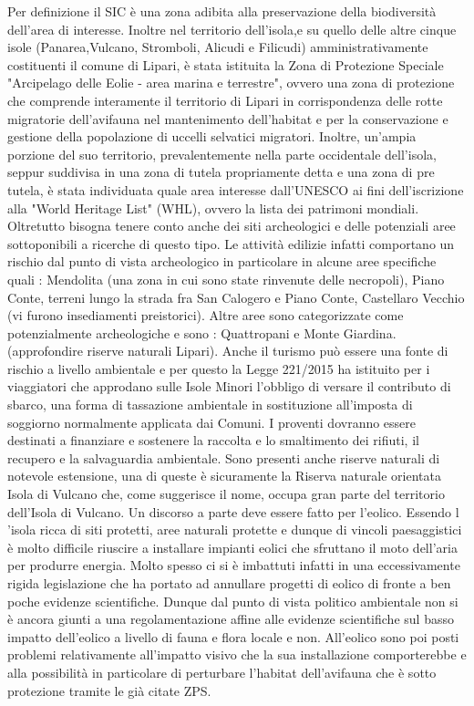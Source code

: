 \documentclass[fleqn,10pt]{SelfArx} %
\begin{document}
Per definizione il SIC è una zona adibita alla preservazione della biodiversità dell'area di interesse. 
Inoltre nel territorio dell'isola,e su quello delle altre cinque isole (Panarea,Vulcano, Stromboli, Alicudi e Filicudi) amministrativamente costituenti il comune di Lipari, è stata istituita la Zona di Protezione Speciale "Arcipelago delle Eolie - area marina e terrestre", ovvero una zona di protezione che comprende interamente il territorio di Lipari in corrispondenza delle rotte migratorie dell'avifauna nel mantenimento dell'habitat e per la conservazione e gestione della popolazione di uccelli selvatici migratori.
Inoltre, un'ampia porzione del suo territorio, prevalentemente nella parte occidentale dell'isola, seppur suddivisa in una zona di tutela propriamente detta e una zona di pre tutela, è stata individuata quale area interesse dall'UNESCO ai fini dell'iscrizione alla "World Heritage List" (WHL), ovvero la lista dei patrimoni mondiali. 
Oltretutto bisogna tenere conto anche dei siti archeologici e delle potenziali aree sottoponibili a ricerche di questo tipo. 
Le attività edilizie infatti comportano un rischio dal punto di vista archeologico in particolare in alcune aree specifiche quali : Mendolita (una zona in cui sono state rinvenute delle necropoli), Piano Conte, terreni lungo la strada fra San Calogero e Piano Conte, Castellaro Vecchio (vi furono insediamenti preistorici). 
Altre aree sono categorizzate come potenzialmente archeologiche e sono : Quattropani e Monte Giardina. (approfondire riserve naturali Lipari). 
Anche il turismo può essere una fonte di rischio a livello ambientale e per questo la Legge 221/2015 ha istituito per i viaggiatori che approdano sulle Isole Minori l'obbligo di versare il contributo di sbarco, una forma di tassazione ambientale in sostituzione all'imposta di soggiorno normalmente applicata dai Comuni. 
I proventi dovranno essere destinati a finanziare e sostenere la raccolta e lo smaltimento dei rifiuti, il recupero e la salvaguardia ambientale. 
Sono presenti anche riserve naturali di notevole estensione, una di queste è sicuramente la Riserva naturale orientata Isola di Vulcano che, come suggerisce il nome, occupa gran parte del territorio dell'Isola di Vulcano. 
Un discorso a parte deve essere fatto per l'eolico. 
Essendo l 'isola ricca di siti protetti, aree naturali protette e dunque di vincoli paesaggistici è molto difficile riuscire a installare impianti eolici che sfruttano il moto dell'aria per produrre energia. 
Molto spesso ci si è imbattuti infatti in una eccessivamente rigida legislazione che ha portato ad annullare progetti di eolico di fronte a ben poche evidenze scientifiche. 
Dunque dal punto di vista politico ambientale non si è ancora giunti a una regolamentazione affine alle evidenze scientifiche sul basso impatto dell'eolico a livello di fauna e flora locale e non. 
All'eolico sono poi posti problemi relativamente all'impatto visivo che la sua installazione comporterebbe e alla possibilità in particolare di perturbare l'habitat dell'avifauna che è sotto protezione tramite le già citate ZPS.
\end{document}
